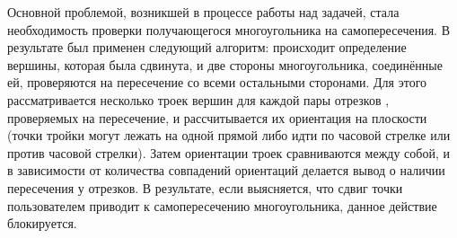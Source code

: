 \documentclass[14pt]{matmex-diploma-custom}
\begin{document}
Основной проблемой, возникшей в процессе работы над задачей, стала необходимость проверки получающегося многоугольника на самопересечения. В результате был применен следующий алгоритм: происходит определение вершины, которая была сдвинута, и две стороны многоугольника, соединённые ей, проверяются на пересечение со всеми остальными сторонами. Для этого рассматривается несколько троек вершин для каждой пары отрезков \cite{intersection}, проверяемых на пересечение, и рассчитывается их ориентация на плоскости (точки тройки могут лежать на одной прямой либо идти по часовой стрелке или против часовой стрелки). Затем ориентации троек сравниваются между собой, и в зависимости от количества совпадений ориентаций делается вывод о наличии пересечения у отрезков. В результате, если выясняется, что сдвиг точки пользователем приводит к самопересечению многоугольника, данное действие блокируется.
\end{document}
